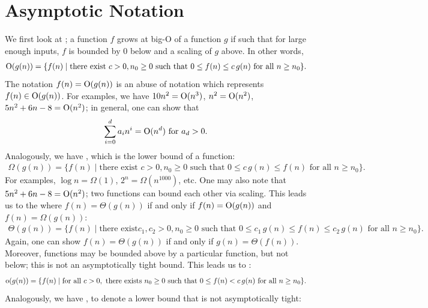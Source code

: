 \section{Asymptotic Notation}
We first look at ; a function $f$ grows at big-O of a function $g$ if such that for large enough inputs, $f$ is bounded by 0 below and a scaling of $g$ above. In other words,
\begin{align}
    \operatorname{O}(g(n)) = \{f(n) \mid \text{there exist } c > 0, n_{0} \geq 0 \text{ such that } 0 \leq f(n) \leq c \, g(n) \text{ for all } n \geq n_{0}\}.
\end{align}
The notation $f(n) = \operatorname{O}(g(n))$ is an abuse of notation which represents $f(n) \in \operatorname{O}(g(n))$. For examples, we have $10 n^{2} = \operatorname{O}(n^{3})$, $n^{2} = \operatorname{O}(n^{2})$, $5n^{2}+6n-8 = \operatorname{O}(n^{2})$; in general, one can show that
\begin{align}
    \sum_{i=0}^{d} a_{i} n^{i} = \operatorname{O}(n^{d}) \text{ for } a_{d} > 0.
\end{align}
Analogously, we have , which is the lower bound of a function:
\begin{align}
    \Omega(g(n)) = \{f(n) \mid \text{there exist } c > 0, n_{0} \geq 0 \text{ such that } 0 \leq c \, g(n) \leq f(n) \text{ for all } n \geq n_{0}\}.
\end{align}
For examples, $\log n = \Omega(1)$, $2^{n} = \Omega(n^{1000})$, etc. One may also note that $5n^{2}+6n-8 = \operatorname{O}(n^{2})$; two functions can bound each other via scaling. This leads us to the  where $f(n) = \Theta(g(n))$ if and only if $f(n) = \operatorname{O}(g(n))$ and $f(n) = \Omega(g(n))$:
\begin{align}
    \Theta(g(n)) = \{f(n) \mid \text{there exist} c_{1}, c_{2} > 0, n_{0} \geq 0 \text{ such that } 0 \leq c_{1} \, g(n) \leq f(n) \leq c_{2} \, g(n) \text{ for all } n \geq n_{0}\}.
\end{align}
Again, one can show $f(n) = \Theta(g(n))$ if and only if $g(n) = \Theta(f(n))$. Moreover, functions may be bounded above by a particular function, but not below; this is not an asymptotically tight bound. This leads us to :
\begin{align}
    \operatorname{o}(g(n)) = \{f(n) \mid \text{for all } c > 0, \text{ there exists } n_{0} \geq 0 \text{ such that } 0 \leq f(n) < c \, g(n) \text{ for all } n \geq n_{0}\}.
\end{align}
Analogously, we have , to denote a lower bound that is not asymptotically tight:
